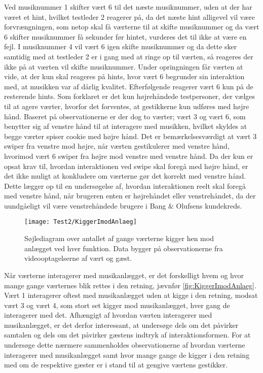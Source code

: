 Ved musiknummer 1 skifter vært 6 til det næste musiknummer, uden at der har været et hint, hvilket testleder 2 reagerer på, da det næste hint alligevel vil være forvrængningen, som netop skal få værterne til at skifte musiknummer og da vært 6 skifter musiknummer få sekunder før hintet, vurderes det til ikke at være en fejl. I musiknummer 4 vil vært 6 igen skifte musiknummer og da dette sker samtidig med at testleder 2 er i gang med at ringe op til værten, så reageres der ikke på at værten vil skifte musiknummer. Under opringningen får værten at vide, at der kun skal reageres på hints, hvor vært 6 begrunder sin interaktion med, at musikken var af dårlig kvalitet. Efterfølgende reagerer vært 6 kun på de resterende hints.\blankline
%
Som forklaret er det kun højrehåndede testpersoner, der vælges til at agere værter, hvorfor det forventes, at gestikkerne kun udføres med højre hånd. Baseret på observationerne er der dog to værter; vært 3 og vært 6, som benytter sig af venstre hånd til at interagere med musikken, hvilket skyldes at begge værter spiser cookie med højre hånd. Det er bemærkelsesværdigt at vært 3 swiper fra venstre mod højre, når værten gestikulerer med venstre hånd, hvorimod vært 6 swiper fra højre mod venstre med venstre hånd. Da der kun er opsat krav til, hvordan interaktionen ved swipe skal foregå med højre hånd, er det ikke muligt at konkludere om værterne gør det korrekt med venstre hånd. Dette lægger op til en undersøgelse af, hvordan interaktionen reelt skal foregå med venstre hånd, når brugeren enten er højrehåndet eller venstrehåndet, da der uundgåeligt vil være venstrehåndede brugere i Bang $\&$ Olufsens kundekreds.     
%
\begin{figure}[H]
	\centering
	\texttt{[image: Test2/KiggerImodAnlaeg]}
	\caption{Søjlediagram over antallet af gange værterne kigger hen mod anlægget ved hver funktion. Data bygger på observationerne fra videooptagelserne af vært og gæst.}
	\label{fig:KiggerImodAnlaeg}
\end{figure}
\noindent
% 
Når værterne interagerer med musikanlægget, er det forskelligt hvem og hvor mange gange værternes blik rettes i den retning, jævnfør \autoref{fig:KiggerImodAnlaeg}. Vært 1 interagerer oftest med musikanlægget uden at kigge i den retning, modsat vært 3 og vært 4, som stort set kigger mod musikanlægget, hver gang de interagerer med det. Afhængigt af hvordan værten interagerer med musikanlægget, er det derfor interessant, at undersøge dels om det påvirker samtalen og dels om det påvirker gæstens indtryk af interaktionsformen. For at undersøge dette nærmere sammenholdes observationerne af hvordan værterne interagerer med musikanlægget samt hvor mange gange de kigger i den retning med om de respektive gæster er i stand til at gengive værtens gestikker. 

